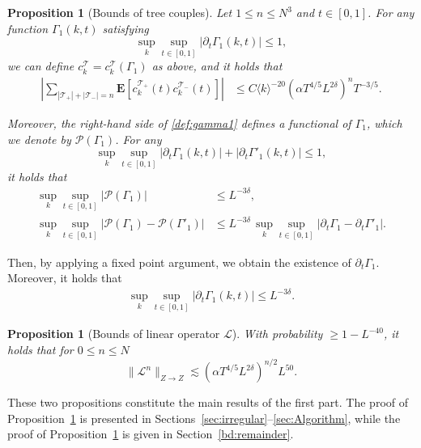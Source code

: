 \documentclass[UTF-8,reqno]{amsart}
\numberwithin{equation}{section}
\newtheorem{proposition}[theorem]{Proposition}
\theoremstyle{definition}
\def\geq{\geqslant}
\def\leq{\leqslant}
\def\geq{\geqslant}
\def\leq{\leqslant}
\begin{document}
\begin{proposition}[Bounds of tree couples]\label{prop:couple}
Let $1 \leq n \leq N^3$ and $t \in [0,1]$. For any function $\Gamma_1(k,t)$ satisfying
\[
\sup_k \sup_{t \in [0,1]} |\partial_t \Gamma_1(k,t)| \leq 1,
\]
we can define $c_{k}^{\mathcal{T}}=c_{k}^{\mathcal{T}}( \Gamma_1)$ as above, and it holds that
\begin{align}
\left|\sum_{|\mathcal{T}_{+}| + |\mathcal{T}_{-}| = n} \mathbf{E}\left[c_{k}^{\mathcal{T}_{+}}(t) c_{k}^{\mathcal{T}_{-}}(t)\right]\right| 
&\leq C \langle k \rangle^{-20} (\alpha T^{4/5} L^{2\delta})^n T^{-3/5}. \label{bd:couple}
\end{align}

Moreover, the right-hand side of \eqref{def:gamma1} defines a functional of $\Gamma_1$,  which we denote by $\mathscr{P}(\Gamma_1)$. For any 
\[
\sup_k \sup_{t \in [0,1]} |\partial_t \Gamma_1(k,t)| + |\partial_t {\Gamma}'_1(k,t)| \leq 1,
\]
it holds that
\begin{align*}
\sup_k \sup_{t \in [0,1]} |\mathscr{P}(\Gamma_1)| &\leq L^{-3\delta},\\
\sup_k \sup_{t \in [0,1]} |\mathscr{P}(\Gamma_1) - \mathscr{P}({\Gamma}'_1)| &\leq L^{-3\delta} \, \sup_k \sup_{t \in [0,1]} |\partial_t \Gamma_1 - \partial_t {\Gamma}'_1|.
\end{align*}
\end{proposition}

Then, by applying a fixed point argument, we obtain the existence of $\partial_t \Gamma_1$. Moreover, it holds that
\begin{align}
   \sup_k\sup_{t\in[0,1]}|   \partial_t\Gamma_1(k,t)|\leq L^{-3\delta}.\label{bd:gamma'}
\end{align}

\begin{proposition}[Bounds of linear operator $\mathscr{L}$]\label{prop:l}
  With probability $\geq 1-L^{-40}$, it holds that for $0\leq n\leq N$
\begin{equation}\label{defop} \|\mathscr{L}^n\|_{Z\to Z} \lesssim(\alpha  T^{4/5}  L^{2\delta})^{n/2} L^{50}. 
\end{equation}
\end{proposition}

These two propositions constitute the main results of the first part. The proof of Proposition~\ref{prop:couple} is presented in Sections~\ref{sec:irregular}--\ref{sec:Algorithm}, while the proof of Proposition~\ref{prop:l} is given in Section~\ref{bd:remainder}.
\end{document}
